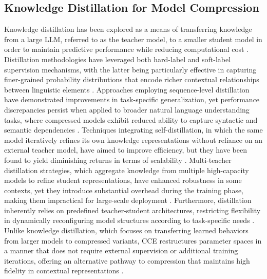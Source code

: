 \subsection{Knowledge Distillation for Model Compression}
Knowledge distillation has been explored as a means of transferring knowledge from a large LLM, referred to as the teacher model, to a smaller student model in order to maintain predictive performance while reducing computational cost \cite{aturd2024dynamic}. Distillation methodologies have leveraged both hard-label and soft-label supervision mechanisms, with the latter being particularly effective in capturing finer-grained probability distributions that encode richer contextual relationships between linguistic elements \cite{sasaki2024enhancing}. Approaches employing sequence-level distillation have demonstrated improvements in task-specific generalization, yet performance discrepancies persist when applied to broader natural language understanding tasks, where compressed models exhibit reduced ability to capture syntactic and semantic dependencies \cite{lococ2024token}. Techniques integrating self-distillation, in which the same model iteratively refines its own knowledge representations without reliance on an external teacher model, have aimed to improve efficiency, but they have been found to yield diminishing returns in terms of scalability \cite{ arsal2024emerging}. Multi-teacher distillation strategies, which aggregate knowledge from multiple high-capacity models to refine student representations, have enhanced robustness in some contexts, yet they introduce substantial overhead during the training phase, making them impractical for large-scale deployment \cite{xiong2024integrating}. Furthermore, distillation inherently relies on predefined teacher-student architectures, restricting flexibility in dynamically reconfiguring model structures according to task-specific needs \cite{keith2024optimizing}. Unlike knowledge distillation, which focuses on transferring learned behaviors from larger models to compressed variants, CCE restructures parameter spaces in a manner that does not require external supervision or additional training iterations, offering an alternative pathway to compression that maintains high fidelity in contextual representations \cite{lesatod2024adaptive}. 

